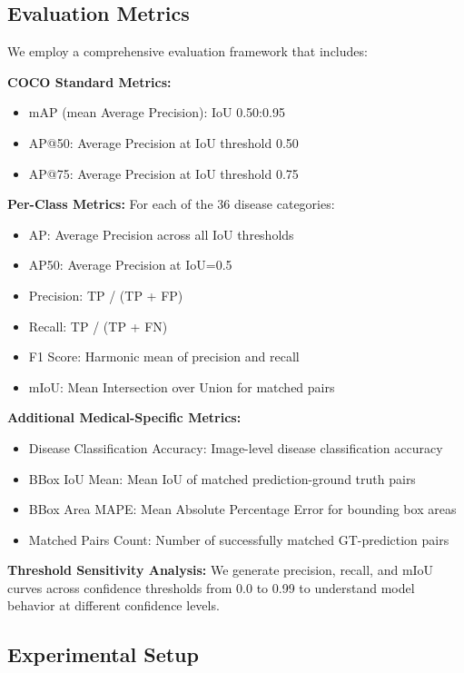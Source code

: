 \documentclass[10pt,twocolumn]{article}
\begin{document}
\subsection{Evaluation Metrics}

We employ a comprehensive evaluation framework that includes:

\textbf{COCO Standard Metrics:}
\begin{itemize}
\item mAP (mean Average Precision): IoU 0.50:0.95
\item AP@50: Average Precision at IoU threshold 0.50
\item AP@75: Average Precision at IoU threshold 0.75
\end{itemize}

\textbf{Per-Class Metrics:}
For each of the 36 disease categories:
\begin{itemize}
\item AP: Average Precision across all IoU thresholds
\item AP50: Average Precision at IoU=0.5
\item Precision: TP / (TP + FP)
\item Recall: TP / (TP + FN)
\item F1 Score: Harmonic mean of precision and recall
\item mIoU: Mean Intersection over Union for matched pairs
\end{itemize}

\textbf{Additional Medical-Specific Metrics:}
\begin{itemize}
\item Disease Classification Accuracy: Image-level disease classification accuracy
\item BBox IoU Mean: Mean IoU of matched prediction-ground truth pairs
\item BBox Area MAPE: Mean Absolute Percentage Error for bounding box areas
\item Matched Pairs Count: Number of successfully matched GT-prediction pairs
\end{itemize}

\textbf{Threshold Sensitivity Analysis:}
We generate precision, recall, and mIoU curves across confidence thresholds from 0.0 to 0.99 to understand model behavior at different confidence levels.

\subsection{Experimental Setup}
\end{document}
